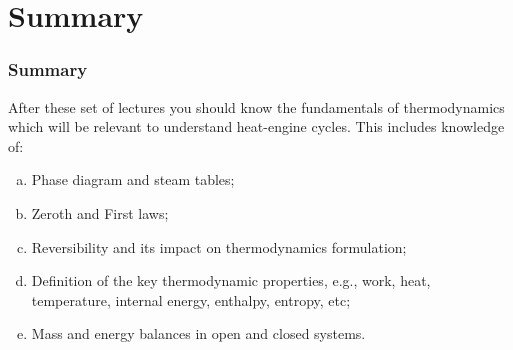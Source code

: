\documentclass[10pt,compress,handout,ignorenonframetext]{beamer}
\begin{document}
\section{Summary}
\begin{frame}
 \frametitle{Summary}
After these set of lectures you should know the fundamentals of thermodynamics which will be relevant to understand heat-engine cycles. This includes knowledge of: 
 \begin{enumerate}[(a)]
  \item <2-> Phase diagram and steam tables;
  \item <3-> Zeroth and First laws;
  \item <4-> Reversibility and its impact on thermodynamics formulation;
  \item <5-> Definition of the key thermodynamic properties, e.g., work, heat, temperature, internal energy, enthalpy, entropy, etc;
  \item <6-> Mass and energy balances in open and closed systems.
 \end{enumerate}
\end{frame}

 


%  
\end{document}

